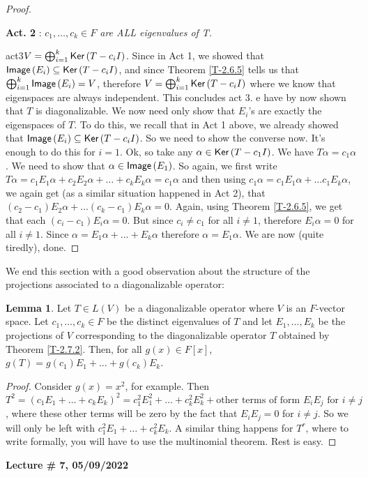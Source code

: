 \documentclass[letterpaper,11pt,twoside]{article}
\theoremstyle{definition}
\theoremstyle{definition}
\theoremstyle{definition}
\theoremstyle{definition}
\newtheorem{lemma}[proposition]{\textbf{Lemma}}
\theoremstyle{definition}
\theoremstyle{definition}
\theoremstyle{remark}
\theoremstyle{definition}
\newenvironment{act}[2]{\begin{center}
    \textbf{Act. #1} : \textit{#2}
\end{center}
}
\newcommand{\Ker}[1]{{\fontfamily{lmss}\selectfont 
		\text{Ker}\left (#1\right )
}}
\newcommand{\Image}[1]{{\fontfamily{lmss}\selectfont 
		\text{Image}\left (#1\right )
}}
\newcommand{\newlecture}[2]{\begin{center}
    \textbf{Lecture \# #1, #2}
\end{center}}
\begin{document}
\begin{proof}
\begin{act}{2}{$c_1,\dots,c_k\in F$ are ALL eigenvalues of T.}
        \end{act}
        \begin{act}{3}{$V = \bigoplus_{i=1}^k\Ker{T-c_iI}$.}
            Since in Act 1, we showed that $\Image{E_i} \subseteq \Ker{T-c_iI}$, and since Theorem \ref{T-2.6.5} tells us that $\bigoplus_{i=1}^k \Image{E_i} = V$, therefore $V= \bigoplus_{i=1}^k \Ker{T-c_iI}$ where we know that eigenspaces are always independent. This concludes act 3.
        \end{act}
        We have by now shown that $T$ is diagonalizable. We now need only show that $E_i$'s are exactly the eigenspaces of $T$. To do this, we recall that in Act 1 above, we already showed that $\Image{E_i} \subseteq \Ker{T-c_iI}$. So we need to show the converse now. It's enough to do this for $i=1$. Ok, so take any $\alpha \in \Ker{T-c_1I}$. We have $T\alpha = c_1\alpha$. We need to show that $\alpha \in \Image{E_1}$. So again, we first write $T\alpha = c_1E_1\alpha + c_2E_2\alpha + \dots +c_kE_k\alpha = c_1\alpha$ and then using $c_1\alpha = c_1E_1\alpha + \dots c_1E_k\alpha$, we again get (as a similar situation happened in Act 2), that $(c_2-c_1)E_2\alpha + \dots (c_k-c_1)E_k\alpha = 0$. Again, using Theorem \ref{T-2.6.5}, we get that each $(c_i-c_1)E_i\alpha = 0$. But since $c_i \neq c_1$ for all $i\neq 1$, therefore $E_i\alpha = 0$ for all $i\neq 1$. Since $\alpha = E_1\alpha + \dots +E_k\alpha $ therefore $\alpha = E_1\alpha$. We are now (quite tiredly), done.
    \end{proof}
    We end this section with a good observation about the structure of the projections associated to a diagonalizable operator:
    \begin{lemma}
        Let $T\in L(V)$ be a diagonalizable operator where $V$ is an $F$-vector space. Let $c_1,\dots,c_k \in F$ be the distinct eigenvalues of $T$ and let $E_1,\dots,E_k$ be the projections of $V$ corresponding to the diagonalizable operator $T$ obtained by Theorem \ref{T-2.7.2}. Then, for all $g(x) \in F[x]$, $g(T) = g(c_1)E_1 + \dots + g(c_k)E_k$.
    \end{lemma}
    \begin{proof}
    Consider $g(x) = x^2$, for example. Then $T^2 = (c_1 E_1 + \dots + c_kE_k)^2 = c_1^2 E_1^2 + \dots + c_k^2 E_k^2 + \text{other terms of form $E_iE_j$ for $i\neq j$}$, where these other terms will be zero by the fact that $E_iE_j = 0$ for $i\neq j$. So we will only be left with $c_1^2E_1 + \dots + c_k^2 E_k$. A similar thing happens for $T^r$, where to write formally, you will have to use the multinomial theorem. Rest is easy.
    \end{proof}
    \newlecture{7}{05/09/2022}
\end{document}
